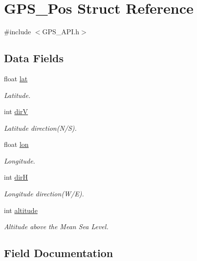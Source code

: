 \hypertarget{struct_g_p_s___pos}{}\section{G\+P\+S\+\_\+\+Pos Struct Reference}
\label{struct_g_p_s___pos}


{\ttfamily \#include $<$G\+P\+S\+\_\+\+A\+P\+I.\+h$>$}

\subsection*{Data Fields}
\begin{DoxyCompactItemize}
\item 
float \hyperlink{struct_g_p_s___pos_ae55f065c95e023aa6c2514b2b9ad4a22}{lat}
\begin{DoxyCompactList}\small\item\em Latitude. \end{DoxyCompactList}\item 
int \hyperlink{struct_g_p_s___pos_ab3d7fbfa15088b89e1fb7c8587ce51ec}{dir\+V}
\begin{DoxyCompactList}\small\item\em Latitude direction(N/\+S). \end{DoxyCompactList}\item 
float \hyperlink{struct_g_p_s___pos_af59ee077fefdb65db12a1543dde1d21f}{lon}
\begin{DoxyCompactList}\small\item\em Longitude. \end{DoxyCompactList}\item 
int \hyperlink{struct_g_p_s___pos_af04238fbd3021bba0b7ab2531a828c72}{dir\+H}
\begin{DoxyCompactList}\small\item\em Longitude direction(W/\+E). \end{DoxyCompactList}\item 
int \hyperlink{struct_g_p_s___pos_a9e54ec2d7e031746f3e5b03e7c36a28e}{altitude}
\begin{DoxyCompactList}\small\item\em Altitude above the Mean Sea Level. \end{DoxyCompactList}\end{DoxyCompactItemize}


\subsection{Field Documentation}
\hypertarget{struct_g_p_s___pos_a9e54ec2d7e031746f3e5b03e7c36a28e}{}
